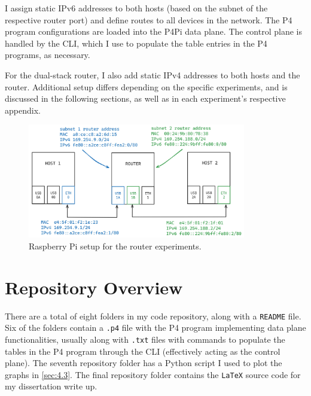 I assign static IPv6 addresses to both hosts (based on the subnet of the respective router port) and define routes to all devices in the network. The P4 program configurations are loaded into the P4Pi data plane. The control plane is handled by the CLI, which I use to populate the table entries in the P4 programs, as necessary.

For the dual-stack router, I also add static IPv4 addresses to both hosts and the router. Additional setup differs depending on the specific experiments, and is discussed in the following sections, as well as in each experiment’s respective appendix. 

\begin{figure}[htbp]
  \centering
    \includegraphics[width=0.85\textwidth]{figures/implementation/setup.jpg}
     \caption{Raspberry Pi setup for the router experiments.}
     \label{fig:impl-setup}
\end{figure}

\pagebreak

\section{Repository Overview}
\label{sec:3.2}

There are a total of eight folders in my code repository, along with a \texttt{README} file. Six of the folders contain a \texttt{.p4} file with the P4 program implementing data plane functionalities, usually along with \texttt{.txt} files with commands to populate the tables in the P4 program through the CLI (effectively acting as the control plane). The seventh repository folder has a Python script I used to plot the graphs in \cref{sec:4.3}. The final repository folder contains the \texttt{LaTeX} source code for my dissertation write up.

\bigskip


